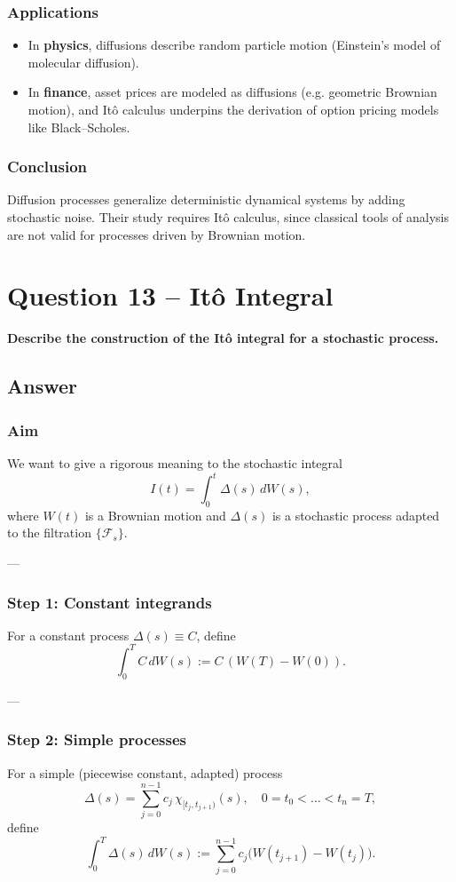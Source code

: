 \documentclass[12pt,a4paper]{book}
\theoremstyle{remark}
\newcommand{\F}{\mathcal{F}}          %
\begin{document}
\subsubsection*{Applications}
\begin{itemize}
    \item In \textbf{physics}, diffusions describe random particle motion (Einstein’s model of molecular diffusion).
    \item In \textbf{finance}, asset prices are modeled as diffusions (e.g. geometric Brownian motion), and Itô calculus underpins the derivation of option pricing models like Black–Scholes.
\end{itemize}

\subsubsection*{Conclusion}
Diffusion processes generalize deterministic dynamical systems by adding stochastic noise. Their study requires Itô calculus, since classical tools of analysis are not valid for processes driven by Brownian motion.

\newpage
\section{Question 13 -- Itô Integral}
\textbf{Describe the construction of the Itô integral for a stochastic process.}

\subsection*{Answer}

\subsubsection*{Aim}
We want to give a rigorous meaning to the stochastic integral
\[
I(t) = \int_0^t \Delta(s)\,dW(s),
\]
where $W(t)$ is a Brownian motion and $\Delta(s)$ is a stochastic process adapted to the filtration $\{\F_s\}$.

---

\subsubsection*{Step 1: Constant integrands}
For a constant process $\Delta(s) \equiv C$, define
\[
\int_0^T C\,dW(s) := C\,(W(T)-W(0)).
\]

---

\subsubsection*{Step 2: Simple processes}
For a simple (piecewise constant, adapted) process
\[
\Delta(s) = \sum_{j=0}^{n-1} c_j \,\chi_{[t_j,t_{j+1})}(s), \quad 0=t_0<\dots<t_n=T,
\]
define
\[
\int_0^T \Delta(s)\,dW(s) := \sum_{j=0}^{n-1} c_j \big(W(t_{j+1})-W(t_j)\big).
\]
\end{document}
